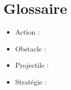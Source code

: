 %

\chapter{Glossaire}
\label{s:glossaire}

\begin{itemize}
	\item Action :
	\\
	\item Obstacle : 
	\\
	\item Projectile : 
	\\
	\item Stratégie :
	\\
\end{itemize}
